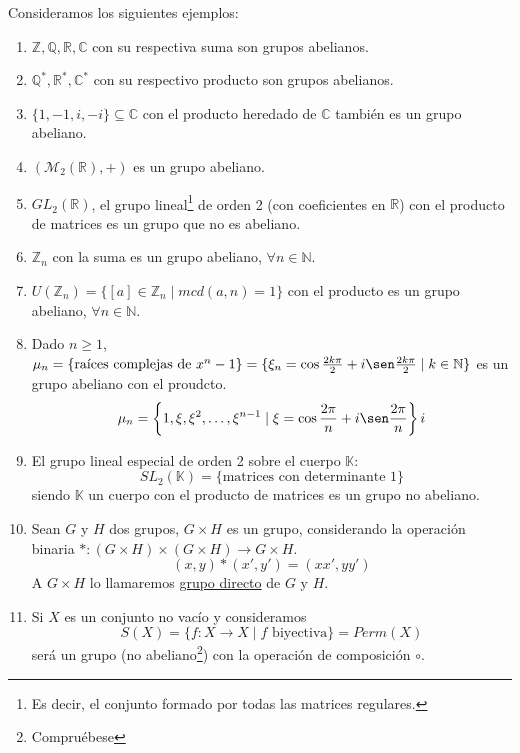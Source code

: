 \begin{ejemplo} Consideramos los siguientes ejemplos:
     \begin{enumerate}
         \item $\mathbb{Z},\mathbb{Q},\mathbb{R},\mathbb{C}$ con su respectiva suma son grupos abelianos.
         \item $\mathbb{Q}^\ast,\mathbb{R}^\ast,\mathbb{C}^\ast$ con su respectivo producto son grupos abelianos.
         \item $\{1,-1,i,-i\}\subseteq \mathbb{C}$ con el producto heredado de $\mathbb{C}$ también es un grupo abeliano.
         \item $(\mathcal{M}_2(\mathbb{R}),+)$ es un grupo abeliano.
         \item $GL_2(\mathbb{R})$, el grupo lineal\footnote{Es decir, el conjunto formado por todas las matrices regulares.} de orden 2 (con coeficientes en $\mathbb{R}$) con el producto de matrices es un grupo que no es abeliano.
         \item $\mathbb{Z}_n$ con la suma es un grupo abeliano, $\forall n\in \mathbb{N}$.
         \item $U(\mathbb{Z}_n)=\{[a]\in \mathbb{Z}_n \mid mcd(a,n)=1\}$ con el producto es un grupo abeliano, $\forall n\in \mathbb{N}$.
         \item Dado $n\geq 1$, $\mu_n=\{\text{raíces complejas de\ } x^n-1\} = \{\xi_n = \cos\frac{2k\pi}{2}+i\sen\frac{2k\pi}{2} \mid k\in \mathbb{N}\}$ es un grupo abeliano con el proudcto.
             \begin{equation*}
                 \mu_n = \left\{1,\xi,\xi^2, \ldots, \xi^{n-1} \mid \xi = \cos\frac{2\pi}{n} + i\sen\frac{2\pi}{n}\right\}i
             \end{equation*}
         \item El grupo lineal especial de orden 2 sobre el cuerpo $\mathbb{K}$: 
             \begin{equation*}
                 SL_2(\mathbb{K}) = \{\text{matrices con determinante 1}\}
             \end{equation*}
             siendo $\mathbb{K}$ un cuerpo con el producto de matrices es un grupo no abeliano.
         \item Sean $G$ y $H$ dos grupos, $G\times H$ es un grupo, considerando la operación binaria $\ast:(G\times H)\times(G\times H)\rightarrow G\times H$.
             \begin{equation*}
                 (x,y)\ast(x',y') = (xx',yy')
             \end{equation*}
             A $G\times H$ lo llamaremos \underline{grupo directo} de $G$ y $H$.
         \item Si $X$ es un conjunto no vacío y consideramos
             \begin{equation*}
                 S(X) = \{f:X\rightarrow X \mid f \text{\ biyectiva}\} = Perm(X)
             \end{equation*}
             será un grupo (no abeliano\footnote{Compruébese}) con la operación de composición $\circ$.


\end{enumerate}
\end{ejemplo}
